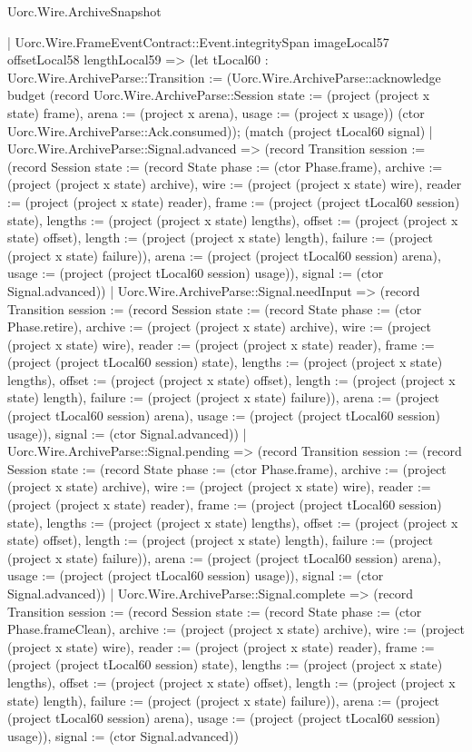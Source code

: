 \begin{lexlean}{Uorc.Wire.ArchiveSnapshot}
\begin{semanticmodule}
{      | Uorc.Wire.FrameEventContract::Event.integritySpan imageLocal57 offsetLocal58 lengthLocal59 => (let tLocal60 : Uorc.Wire.ArchiveParse::Transition := (Uorc.Wire.ArchiveParse::acknowledge budget (record Uorc.Wire.ArchiveParse::Session {state := (project (project x state) frame), arena := (project x arena), usage := (project x usage)}) (ctor Uorc.Wire.ArchiveParse::Ack.consumed)); (match (project tLocal60 signal)
        | Uorc.Wire.ArchiveParse::Signal.advanced => (record Transition {session := (record Session {state := (record State {phase := (ctor Phase.frame), archive := (project (project x state) archive), wire := (project (project x state) wire), reader := (project (project x state) reader), frame := (project (project tLocal60 session) state), lengths := (project (project x state) lengths), offset := (project (project x state) offset), length := (project (project x state) length), failure := (project (project x state) failure)}), arena := (project (project tLocal60 session) arena), usage := (project (project tLocal60 session) usage)}), signal := (ctor Signal.advanced)})
        | Uorc.Wire.ArchiveParse::Signal.needInput => (record Transition {session := (record Session {state := (record State {phase := (ctor Phase.retire), archive := (project (project x state) archive), wire := (project (project x state) wire), reader := (project (project x state) reader), frame := (project (project tLocal60 session) state), lengths := (project (project x state) lengths), offset := (project (project x state) offset), length := (project (project x state) length), failure := (project (project x state) failure)}), arena := (project (project tLocal60 session) arena), usage := (project (project tLocal60 session) usage)}), signal := (ctor Signal.advanced)})
        | Uorc.Wire.ArchiveParse::Signal.pending => (record Transition {session := (record Session {state := (record State {phase := (ctor Phase.frame), archive := (project (project x state) archive), wire := (project (project x state) wire), reader := (project (project x state) reader), frame := (project (project tLocal60 session) state), lengths := (project (project x state) lengths), offset := (project (project x state) offset), length := (project (project x state) length), failure := (project (project x state) failure)}), arena := (project (project tLocal60 session) arena), usage := (project (project tLocal60 session) usage)}), signal := (ctor Signal.advanced)})
        | Uorc.Wire.ArchiveParse::Signal.complete => (record Transition {session := (record Session {state := (record State {phase := (ctor Phase.frameClean), archive := (project (project x state) archive), wire := (project (project x state) wire), reader := (project (project x state) reader), frame := (project (project tLocal60 session) state), lengths := (project (project x state) lengths), offset := (project (project x state) offset), length := (project (project x state) length), failure := (project (project x state) failure)}), arena := (project (project tLocal60 session) arena), usage := (project (project tLocal60 session) usage)}), signal := (ctor Signal.advanced)})
}
\end{semanticmodule}
\end{lexlean}
